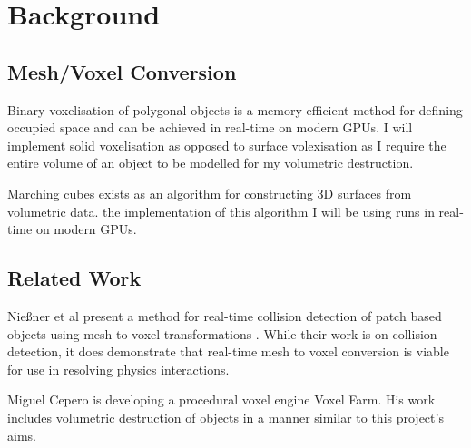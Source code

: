 
\section{Background}

\subsection{Mesh/Voxel Conversion}

\label{methods}

Binary voxelisation of polygonal objects is a memory efficient method for defining occupied space and can be achieved in real-time on modern GPUs\cite{V,SW,OCL}. I will implement solid voxelisation as opposed to surface volexisation as I require the entire volume of an object to be modelled for my volumetric destruction.

Marching cubes exists as an algorithm for constructing 3D surfaces from volumetric data\cite{MC}. the implementation of this algorithm I will be using runs in real-time on modern GPUs\cite{MCGPU}.

\subsection{Related Work}

Nie\ss{}ner et al present a method for real-time collision detection of patch based objects using mesh to voxel transformations \cite{RTC}. While their work is on collision detection, it does demonstrate that real-time mesh to voxel conversion is viable for use in resolving physics interactions.

Miguel Cepero is developing a procedural voxel engine Voxel Farm\cite{PW}. His work includes volumetric destruction of objects in a manner similar to this project's aims\cite{AfD}.